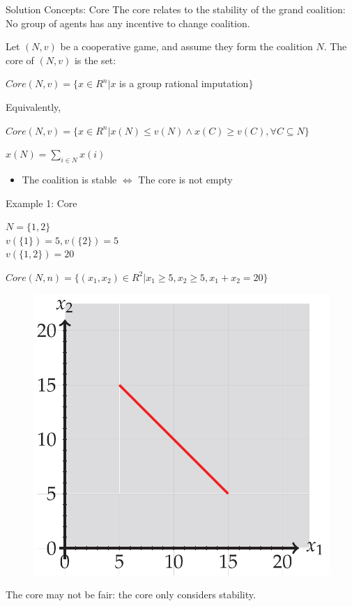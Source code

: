 \documentclass{beamer}
\begin{document}
\begin{frame} {Solution Concepts: Core}
    The core relates to the stability of the grand coalition: \\ No group of agents has any incentive to change coalition.
    \begin{definition}\label{dfn:core}
        Let $(N,v)$ be a cooperative game, and assume they form the coalition $N$. The core of $(N,v)$ is the set:
        \vspace{0.1cm}
        \begin{center}
            $Core(N,v) = \{x \in R^n | x$ is a group rational imputation$\}$
        \end{center}
        Equivalently,
        \vspace{0.1cm}
        \begin{center}
            $Core(N,v) = \{x \in R^n | x(N) \leq v(N) \wedge x(C) \geq v(C), \forall C \subseteq N\}$ \\
        \end{center}
        \small{$x(N) = \sum_{i \in N} x(i)$}
    \end{definition}

    \begin{itemize}
       \item The coalition is stable $\Leftrightarrow$ The core is not empty
    \end{itemize}

\end{frame}
\begin{frame} {Example 1: Core}

    \begin{center}
      $N = \{1,2\}$ \\
      $v(\{1\}) = 5, v(\{2\}) = 5$ \\
      $v(\{1,2\}) = 20$ \\
    \end{center}

    $Core(N,n) = \{(x_1,x_2) \in R^2 | x_1 \geq 5, x_2 \geq 5, x_1 + x_2 = 20\}$

    \begin{figure}[htbp]
        \centering
        \includegraphics[width=0.3 \columnwidth]{figures/coreex1.png}
    \end{figure}

    The core may not be fair: the core only considers stability.

\end{frame}
\end{document}
